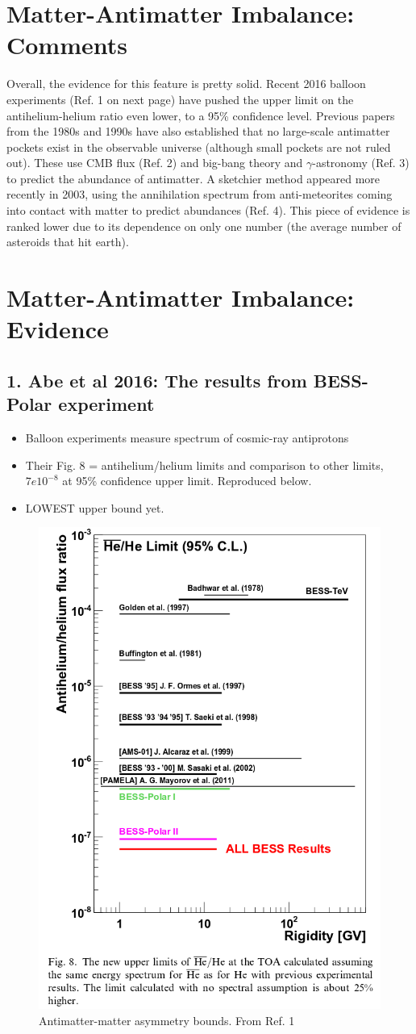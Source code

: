 \documentclass{article}
\begin{document}
\newpage
\section{Matter-Antimatter Imbalance: Comments}
Overall, the evidence for this feature is pretty solid. Recent 2016 balloon experiments (Ref. 1 on next page) have pushed the upper limit on the antihelium-helium ratio even lower, to a 95\% confidence level. Previous papers from the 1980s and 1990s have also established that no large-scale antimatter pockets exist in the observable universe (although small pockets are not ruled out). These use CMB flux (Ref. 2) and big-bang theory and $\gamma$-astronomy (Ref. 3) to predict the abundance of antimatter. A sketchier method appeared more recently in 2003, using the annihilation spectrum from anti-meteorites coming into contact with matter to predict abundances (Ref. 4). This piece of evidence is ranked lower due to its dependence on only one number (the average number of asteroids that hit earth).

\newpage
\section*{Matter-Antimatter Imbalance: Evidence}
\subsection*{1. Abe et al 2016: The results from BESS-Polar experiment}
\begin{itemize}
\item Balloon experiments measure spectrum of cosmic-ray antiprotons
\item Their Fig. 8 = antihelium/helium limits and comparison to other limits, $7e10^{-8}$ at 95\% confidence upper limit. Reproduced below.
\item LOWEST upper bound yet.
\end{itemize}

\begin{figure}[h]
\begin{center}
\includegraphics[width=.4\textwidth,angle=0.]{antimatter.png}
\end{center}
\caption{Antimatter-matter asymmetry bounds. From Ref. 1}
\end{figure}
\end{document}
